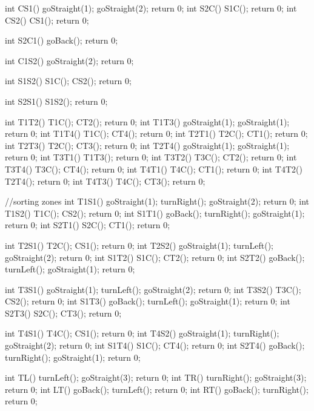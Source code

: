 int CS1()
{
    goStraight(1);
	goStraight(2);
    return 0;
}
int S2C()
{
    S1C();
    return 0;
}
int CS2()
{
    CS1();
    return 0;
}

int S2C1()
{
    goBack();
    return 0;
}

int C1S2()
{
    goStraight(2);
    return 0;
}

int S1S2()
{
    S1C();
    CS2();
    return 0;
}

int S2S1()
{
    S1S2();
    return 0;
}

int T1T2()
{
    T1C();
    CT2();
    return 0;
}
int T1T3()
{
    goStraight(1);
	goStraight(1);
    return 0;
}
int T1T4()
{
    T1C();
    CT4();
    return 0;
}
int T2T1()
{
    T2C();
    CT1();
    return 0;
}
int T2T3()
{
    T2C();
    CT3();
    return 0;
}
int T2T4()
{
    goStraight(1);
	goStraight(1);
    return 0;
}
int T3T1()
{
    T1T3();
    return 0;
}
int T3T2()
{
    T3C();
    CT2();
    return 0;
}
int T3T4()
{
    T3C();
    CT4();
    return 0;
}
int T4T1()
{
    T4C();
    CT1();
    return 0;
}
int T4T2()
{
    T2T4();
    return 0;    
}
int T4T3()
{
    T4C();
    CT3();
    return 0;
}

//sorting zones
int T1S1()
{
    goStraight(1);
	turnRight();
	goStraight(2);
    return 0;
}
int T1S2()
{
    T1C();
	CS2();
    return 0;
}
int S1T1()
{
    goBack();
    turnRight();
    goStraight(1);
    return 0;
}
int S2T1()
{
    S2C();
    CT1();
    return 0;
}

int T2S1()
{
    T2C();
	CS1();
    return 0;
}
int T2S2()
{
    goStraight(1);
	turnLeft();
	goStraight(2);
    return 0;
}
int S1T2()
{
    S1C();
	CT2();
    return 0;
}
int S2T2()
{
    goBack();
	turnLeft();
	goStraight(1);
    return 0;
}

int T3S1()
{
    goStraight(1);
	turnLeft();
	goStraight(2);
    return 0;
}
int T3S2()
{
    T3C();
	CS2();
    return 0;
}
int S1T3()
{
    goBack();
	turnLeft();
	goStraight(1);
    return 0;
}
int S2T3()
{
    S2C();
    CT3();
    return 0;
}

int T4S1()
{
    T4C();
	CS1();
    return 0;
}
int T4S2()
{
    goStraight(1);
	turnRight();
	goStraight(2);
    return 0;
}
int S1T4()
{
    S1C();
    CT4();
    return 0;
}
int S2T4()
{
    goBack();
	turnRight();
	goStraight(1);
    return 0;
}


int TL()
{
    turnLeft();
	goStraight(3);
    return 0;
}
int TR()
{
    turnRight();
	goStraight(3);
    return 0;
}
int LT()
{
    goBack();
    turnLeft();
    return 0;
}
int RT()
{
    goBack();
    turnRight();
    return 0;
}

